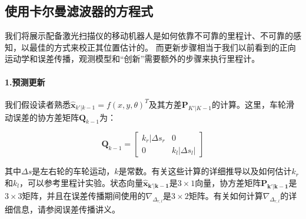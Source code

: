 \subsection{使用卡尔曼滤波器的方程式}
我们将展示配备激光扫描仪的移动机器人是如何依靠不可靠的里程计、不可靠的感知，以最佳的方式来校正其位置估计的。
而更新步骤相当于我们以前看到的正向运动学和误差传播，观测模型和“创新”需要额外的步骤来执行里程计。


\paragraph{1.预测更新}
我们假设读者熟悉$\hat{\boldsymbol{x}}_{k'|k-1}=f(x,y,\theta)^T$及其方差$\boldsymbol{P}_{K'|K-1}$的计算。这里，车轮滑动误差的协方差矩阵$\boldsymbol{Q}_{k-1}$为：

\begin{equation}
\boldsymbol{Q}_{k-1}=\left[\begin{array}{cc}k_r|\Delta s_r & 0\\0 & k_l|\Delta s_l|\end{array}\right]
\end{equation}


其中$\Delta s$是左右轮的车轮运动，$k$是常数。有关这些计算的详细推导以及如何估计$k_r$和$k_l$，可以参考里程计实验。状态向量$\boldsymbol{\hat{x}_{k'|k-1}}$是$3\times 1$向量，协方差矩阵$\boldsymbol{P_{k'|k-1}}$是$3\times 3$矩阵，并且在误差传播期间使用的$\nabla_{\Delta_{r,l}}$是$3\times 2$矩阵。有关如何计算$\nabla_{\Delta_{r,l}}$的详细信息，请参阅误差传播讲义。

